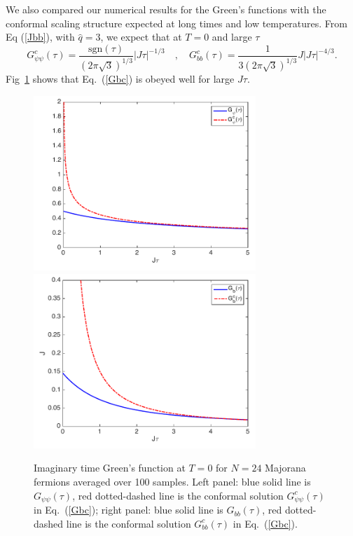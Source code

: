 \documentclass[aps,pre,preprint,onecolumn,citeautoscript,superscriptaddress,nofootinbib,eqsecnum]{revtex4-1}
\newcommand{\beq}{\begin{equation}}
\newcommand{\eeq}{\end{equation}}
\def\nref#1{(\ref{#1})}
\begin{document}
We also compared our numerical results for the Green's functions with the conformal scaling structure expected at
long times and low temperatures. From Eq \nref{Jbb}, with $\hat q =3 $,  we expect that at $T=0$  and  large $\tau$
\beq
G_{\psi \psi}^c(\tau)=\frac{\mbox{sgn}(\tau)}{(2 \pi \sqrt{3})^{1/3}} |   J \tau|^{-1/3} \quad , \quad
G_{bb}^c(\tau)=\frac{1}{3 (2 \pi\sqrt{3})^{1/3}} J |J \tau|^{-4/3} . \label{Gbc}
\eeq
Fig~\ref{fig:GGc} shows that Eq.~(\ref{Gbc}) is obeyed well for large $J \tau$.
\begin{figure}[h]
\center
\includegraphics[width=3.3in]{GpsiGpsic.pdf}
\includegraphics[width=3.3in]{GbGbc.pdf}
\caption{Imaginary time Green's function at $T=0$ for $N=24$ Majorana fermions averaged over 100 samples. Left panel: blue solid line is $G_{\psi \psi}(\tau)$, red dotted-dashed line is the conformal solution $G_{\psi \psi}^c(\tau)$ in Eq.~(\ref{Gbc}); right panel: blue solid line is $G_{bb}(\tau)$, red dotted-dashed line is the conformal solution $G_{bb}^c(\tau)$ in Eq.~(\ref{Gbc}). }
\label{fig:GGc}
\end{figure}
\end{document}
